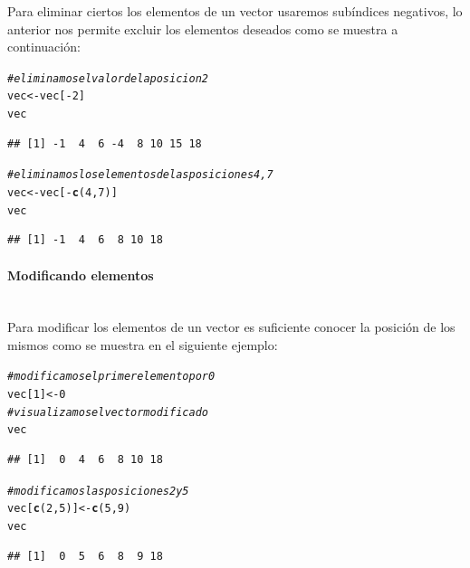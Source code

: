 \documentclass[11pt,a4paper,oneside]{book}\usepackage[]{graphicx}\usepackage[]{color}
\makeatletter
\newcommand{\hlnum}[1]{\textcolor[rgb]{0.686,0.059,0.569}{#1}}%
\newcommand{\hlcom}[1]{\textcolor[rgb]{0.678,0.584,0.686}{\textit{#1}}}%
\newcommand{\hlopt}[1]{\textcolor[rgb]{0,0,0}{#1}}%
\newcommand{\hlstd}[1]{\textcolor[rgb]{0.345,0.345,0.345}{#1}}%
\newcommand{\hlkwb}[1]{\textcolor[rgb]{0.69,0.353,0.396}{#1}}%
\newcommand{\hlkwd}[1]{\textcolor[rgb]{0.737,0.353,0.396}{\textbf{#1}}}%
\newenvironment{kframe}{%
 \def\at@end@of@kframe{}%
 \ifinner\ifhmode%
  \def\at@end@of@kframe{\end{minipage}}%
  \begin{minipage}{\columnwidth}%
 \fi\fi%
 \def\FrameCommand##1{\hskip\@totalleftmargin \hskip-\fboxsep
 \colorbox{shadecolor}{##1}\hskip-\fboxsep
     \hskip-\linewidth \hskip-\@totalleftmargin \hskip\columnwidth}%
 \MakeFramed {\advance\hsize-\width
   \@totalleftmargin\z@ \linewidth\hsize
   \@setminipage}}%
 {\par\unskip\endMakeFramed%
 \at@end@of@kframe}
\newenvironment{knitrout}{}{} %
\makeatother
\begin{document}
\begin{itemize}
Para eliminar ciertos los elementos de un vector usaremos subíndices negativos, lo anterior nos permite excluir los elementos deseados como se muestra a continuación:
\begin{knitrout}
\color{fgcolor}\begin{kframe}
\begin{alltt}
\hlcom{# eliminamos el valor de la posicion 2}
\hlstd{vec} \hlkwb{<-} \hlstd{vec[}\hlopt{-}\hlnum{2}\hlstd{]}
\hlstd{vec}
\end{alltt}
\begin{verbatim}
## [1] -1  4  6 -4  8 10 15 18
\end{verbatim}
\begin{alltt}
\hlcom{# eliminamos los elementos de las posiciones 4, 7}
\hlstd{vec} \hlkwb{<-} \hlstd{vec[}\hlopt{-}\hlkwd{c}\hlstd{(}\hlnum{4}\hlstd{,} \hlnum{7}\hlstd{)]}
\hlstd{vec}
\end{alltt}
\begin{verbatim}
## [1] -1  4  6  8 10 18
\end{verbatim}
\end{kframe}
\end{knitrout}

\paragraph{Modificando elementos}
~\\

Para modificar los elementos de un vector es suficiente conocer la posición de los mismos como se muestra en el siguiente ejemplo:
\begin{knitrout}
\color{fgcolor}\begin{kframe}
\begin{alltt}
\hlcom{# modificamos el primer elemento por 0}
\hlstd{vec[}\hlnum{1}\hlstd{]} \hlkwb{<-} \hlnum{0}
\hlcom{# visualizamos el vector modificado}
\hlstd{vec}
\end{alltt}
\begin{verbatim}
## [1]  0  4  6  8 10 18
\end{verbatim}
\begin{alltt}
\hlcom{# modificamos las posiciones 2 y 5}
\hlstd{vec[}\hlkwd{c}\hlstd{(}\hlnum{2}\hlstd{,} \hlnum{5}\hlstd{)]} \hlkwb{<-} \hlkwd{c}\hlstd{(}\hlnum{5}\hlstd{,} \hlnum{9}\hlstd{)}
\hlstd{vec}
\end{alltt}
\begin{verbatim}
## [1]  0  5  6  8  9 18
\end{verbatim}
\end{kframe}
\end{knitrout}


\end{itemize}
\end{document}
